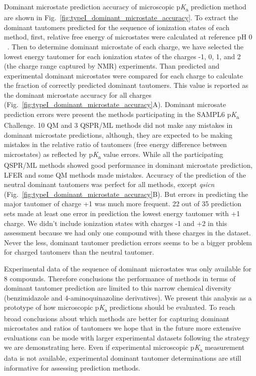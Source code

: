 \documentclass[9pt,lineno,final]{elife}
\newcommand{\pKa}{p\textit{K}\textsubscript{a}}
\begin{document}
Dominant microstate prediction accuracy of microscopic \pKa{} prediction method are shown in Fig.~\ref{fig:typeI_dominant_microstate_accuracy}.
To extract the dominant tautomers predicted for the sequence of ionization states of each method, first, relative free energy of microstates were calculated at reference pH 0 ~\citep{Gunner:2020:J.Comput.AidedMol.Des.}. Then to determine dominant microstate of each charge, we have selected the lowest energy tautomer for each ionization states of the charges -1, 0, 1, and 2 (the charge range captured by NMR) experiments.
Than predicted and experimental dominant microstates were compared for each charge to calculate the fraction of correctly predicted dominant tautomers. This value is reported as the dominant microstate accuracy for all charges (Fig.~\ref{fig:typeI_dominant_microstate_accuracy}A). Dominant microsate prediction errors were present the methods participating in the SAMPL6 \pKa{} Challenge. 10 QM and 3 QSPR/ML methods did not make any mistakes in dominant microstate predictions, although, they are expected to  be making mistakes in the relative ratio of tautomers (free energy difference between microstates) as reflected by \pKa{} value errors. While all the participating QSPR/ML methods showed good performance in dominant microstate prediction, LFER and some QM methods made mistakes. Accuracy of the prediction of the neutral dominant tautomers was perfect for all methods, except \textit{qsicn} (Fig.~\ref{fig:typeI_dominant_microstate_accuracy}B). But errors in predicting the major tautomer of charge +1 was much more frequent. 22 out of 35 prediction sets made at least one error in prediction the lowest energy tautomer with +1 charge. We didn't include ionization states with charges -1 and +2 in this assessment because we had only one compound with these charges in the dataset. Never the less, dominant tautomer prediction errors seems to be a bigger problem for charged tautomers than the neutral tautomer.    

Experimental data of the sequence of dominant microstates was only available for 8 compounds. Therefore conclusions the performance of methods in terms of dominant tautomer prediction are limited to this narrow chemical diversity (benzimidazole and 4-aminoquinazoline derivatives). We present this analysis as a prototype of how microscopic \pKa{} predictions should be evaluated. To reach broad conclusions about which methods are better for capturing dominant microstates and ratios of tautomers we hope that in the future more extensive evaluations can be mode with larger experimental datasets following the strategy we are demonstrating here. Even if experimental microscopic \pKa{} measurement data is not available, experimental dominant tautomer determinations are still informative for assessing prediction methods.  
\end{document}
